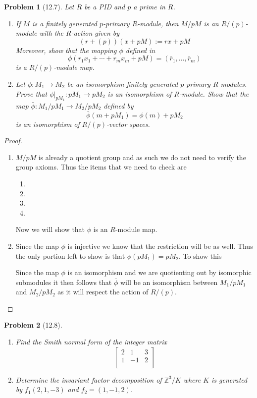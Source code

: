 \documentclass[10pt]{article}
\newcommand{\sk}{\vskip 10mm}
\newcommand{\bb}[1]{\mathbb{#1}}
\theoremstyle{plain}
\newtheorem{problem}{Problem}
\theoremstyle{remark}
\begin{document}
\begin{problem}[12.7]
  Let $R$ be a PID and $p$ a prime in $R$.
  \begin{enumerate}
  \item If $M$ is a finitely generated $p$-primary $R$-module, then
    $M/pM$ is an $R/(p)$-module with the $R$-action given by
    \[ (r+(p))(x+pM):= rx+pM \]
    Moreover, show that the mapping $\phi$ defined in
    \[ \phi(r_1x_1+\cdots + r_mx_m +pM) = (\bar{r}_1,\ldots,\bar{r}_m) \]
    is a $R/(p)$-module map.
  \item Let $\phi:M_1\rightarrow M_2$ be an isomorphism finitely generated $p$-primary
    $R$-modules. Prove that $\phi|_{pM_1}:pM_1\rightarrow pM_2$ is an isomorphism
    of $R$-module. Show that the map $\bar{\phi}:M_1/pM_1\rightarrow M_2/pM_2$ defined by
    \[ \bar{\phi}(m+pM_1)=\phi(m)+pM_2\]
    is an isomorphism of $R/(p)$-vector spaces.
  \end{enumerate}
\end{problem}

\begin{proof}
  \begin{enumerate}
  \item $M/pM$ is already a quotient group and as such we do not need to verify
    the group axioms. Thus the items that we need to check are
    \begin{enumerate}
    \item
    \item
    \item
    \item
    \end{enumerate}

    Now we will show that $\phi$ is an $R$-module map.
  \item Since the map $\phi$ is injective we know that the restriction will be as
    well. Thus the only portion left to show is that $\phi(pM_1)=pM_2$. To show
    this

    Since the map $\phi$ is an isomorphism and we are quotienting out by isomorphic
    submodules it then follows that $\bar{\phi}$ will be an isomorphism between
    $M_1/pM_1$ and $M_2/pM_2$ as it will respect the action of $R/(p)$.
  \end{enumerate}
\end{proof}

\sk

\begin{problem}[12.8]
  \begin{enumerate}
  \item Find the Smith normal form of the integer matrix
    \[
      \left[
        \begin{array}{ccc}
          2&1&3\\
          1&-1&2\\
        \end{array}
      \right]
    \]
  \item Determine the invariant factor decomposition of $\bb{Z}^3/K$ where
    $K$ is generated by $f_1(2,1,-3)$ and $f_2=(1,-1,2)$.
  \end{enumerate}
\end{problem}
\end{document}
